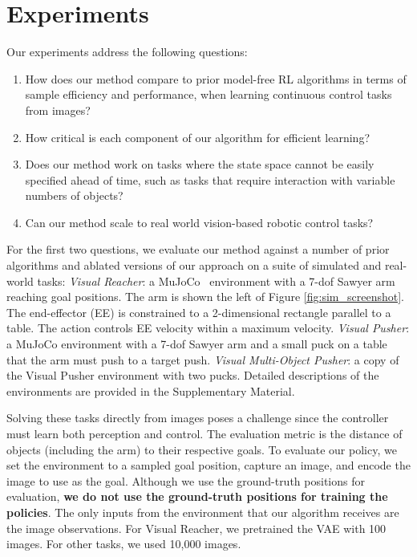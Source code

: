 \documentclass{article}
\begin{document}
\section{Experiments}\label{sec:experiments}
Our experiments address the following questions:
\begin{enumerate}
    \item How does our method compare to prior model-free RL algorithms in terms of sample efficiency and performance, when learning continuous control tasks from images?
    \item How critical is each component of our algorithm for efficient learning?
    \item Does our method work on tasks where the state space cannot be easily specified ahead of time, such as tasks that require interaction with variable numbers of objects?
    \item Can our method scale to real world vision-based robotic control tasks?
\end{enumerate}
For the first two questions, we evaluate our method against a number of prior algorithms and ablated versions of our approach on a suite of simulated and real-world tasks:
\textit{Visual Reacher}: a MuJoCo~\citep{todorov12mujoco} environment with a 7-dof Sawyer arm reaching goal positions.
The arm is shown the left of Figure \ref{fig:sim_screenshot}.
The end-effector (EE) is constrained to a 2-dimensional rectangle parallel to a table.
The action controls EE velocity within a maximum velocity.
\textit{Visual Pusher}: a MuJoCo environment with a 7-dof Sawyer arm and a small puck on a table that the arm must push to a target push.
\textit{Visual Multi-Object Pusher}: a copy of the Visual Pusher environment with two pucks.
Detailed descriptions of the environments are provided in the Supplementary Material.

Solving these tasks directly from images poses a challenge since the controller must learn both perception and control.
The evaluation metric is the distance of objects (including the arm) to their respective goals.
To evaluate our policy, we set the environment to a sampled goal position, capture an image, and encode the image to use as the goal.
Although we use the ground-truth positions for evaluation, \textbf{we do not use the ground-truth positions for training the policies}.
The only inputs from the environment that our algorithm receives are the image observations.
For Visual Reacher, we pretrained the VAE with 100 images.
For other tasks, we used 10,000 images.
\end{document}
